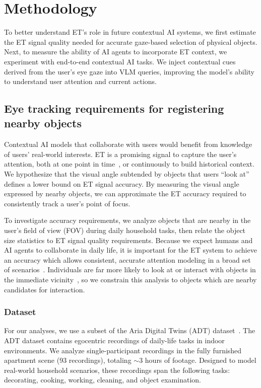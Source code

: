 \section{Methodology}

To better understand ET's role in future contextual AI systems, we first estimate the ET signal quality needed for accurate gaze-based selection of physical objects.  Next, to measure the ability of AI agents to incorporate ET context, we experiment with end-to-end contextual AI tasks.  We inject contextual cues derived from the user's eye gaze into VLM queries, improving the model's ability to understand user attention and current actions.

\subsection{Eye tracking requirements for registering nearby objects}

Contextual AI models that collaborate with users would benefit from knowledge of users' real-world interests.  ET is a promising signal to capture the user's attention, both at one point in time~\cite{konrad_gazegpt_2024}, or continuously to build historical context.  We hypothesize that the visual angle subtended by objects that users ``look at'' defines a lower bound on ET signal accuracy.  By measuring the visual angle expressed by nearby objects, we can approximate the ET accuracy required to consistently track a user's point of focus.

To investigate accuracy requirements, we analyze objects that are nearby in the user's field of view (FOV) during daily household tasks, then relate the object size statistics to ET signal quality requirements.  Because we expect humans and AI agents to collaborate in daily life, it is important for the ET system to achieve an accuracy which allows consistent, accurate attention modeling in a broad set of scenarios~\cite{feit2017toward}.  Individuals are far more likely to look at or interact with objects in the immediate vicinity~\cite{ballendat_proxemic_2010}, so we constrain this analysis to objects which are nearby candidates for interaction.

\subsubsection{Dataset}

For our analyses, we use a subset of the Aria Digital Twins (ADT) dataset~\cite{pan_adt_2023}.  The ADT dataset contains egocentric recordings of daily-life tasks in indoor environments.  We analyze single-participant recordings in the fully furnished apartment scene (93 recordings), totaling $\sim$3 hours of footage.  Designed to model real-world household scenarios, these recordings span the following tasks:  decorating, cooking, working, cleaning, and object examination.

